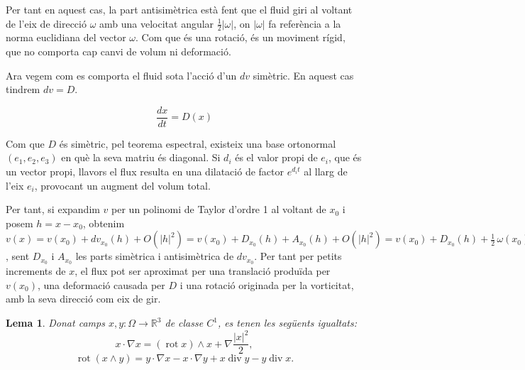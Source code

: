 \documentclass{article}
\numberwithin{equation}{section}
\DeclareMathOperator{\diver}{div}
\DeclareMathOperator{\rot}{rot}
\newtheorem{lema}{Lema}[section]
\begin{document}
Per tant en aquest cas, la part antisim\`{e}trica est\`{a} fent que el fluid giri al voltant de l'eix de direcci\'{o} $\omega$ amb una velocitat angular $\frac{1}{2}|\omega|$, on $|\omega|$ fa refer\`{e}ncia a la norma euclidiana del vector $\omega$. Com que \'{e}s una rotaci\'{o}, \'{e}s un moviment r\'{i}gid, que no comporta cap canvi de volum ni deformaci\'{o}.

Ara vegem com es comporta el fluid sota l'acci\'{o} d'un $dv$ sim\`{e}tric. En aquest cas tindrem $dv=D$.

\begin{equation}
\frac{dx}{dt}=D(x)
\end{equation}

Com que $D$ \'{e}s sim\`{e}tric, pel teorema espectral, existeix una base ortonormal $(e_1,e_2,e_3)$ en qu\`{e} la seva matriu \'{e}s diagonal. Si $d_i$ \'{e}s el valor propi de $e_i$, que \'{e}s un vector propi, llavors el flux resulta en una dilataci\'{o} de factor $e^{d_it}$ al llarg de l'eix $e_i$, provocant un augment del volum total.

Per tant, si expandim $v$ per un polinomi de Taylor d'ordre 1 al voltant de $x_0$ i posem $h=x-x_0$, obtenim $v(x)=v(x_0)+dv_{x_0}(h)+O(|h|^2)=v(x_0)+D_{x_0}(h)+A_{x_0}(h)+O(|h|^2)=v(x_0)+D_{x_0}(h)+\frac{1}{2}\,\omega(x_0)\wedge h+O(|h|^2)$, sent $D_{x_0}$ i $A_{x_0}$ les parts sim\`{e}trica i antisim\`{e}trica de $dv_{x_0}$. Per tant per petits increments de $x$, el flux pot ser aproximat per una translaci\'{o} produ\"{i}da per $v(x_0)$, una deformaci\'{o} causada per $D$ i una rotaci\'{o} originada per la vorticitat, amb la seva direcci\'{o} com eix de gir.

\begin{lema}\label{Lem: analisi vectorial}
Donat camps $x,y:\Omega\rightarrow\mathbb{R}^3$ de classe $C^1$, es tenen les seg\"{u}ents igualtats:
\begin{equation}\label{Equ. analisi vectorial I}
x\cdot\nabla x=(\rot x)\wedge x+\nabla\frac{|x|^2}{2},
\end{equation}
\begin{equation}\label{Equ. analisi vectorial II}
\rot(x\wedge y)=y\cdot\nabla x-x\cdot\nabla y+x\diver y-y\diver x.
\end{equation}
\end{lema}
\end{document}
